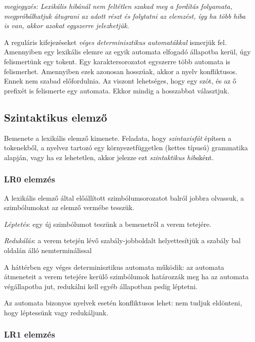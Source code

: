\documentclass[margin=0px]{article}
\begin{document}
	\textit{megjegyzés: Lexikális hibánál nem feltétlen szakad meg a fordítás folyamata, megpróbálhatjuk átugrani az adott részt és folytatni az elemzést, így ha több hiba is van, akkor azokat egyszerre jelezhetjük.}
	
	A reguláris kifejezéseket \textit{véges determinisztikus automatákkal} ismerjük fel. Amennyiben egy lexikális elemre az egyik automata elfogadó állapotba kerül, úgy felismertünk egy tokent. Egy karaktersorozatot egyszerre több automata is felismerhet. Amennyiben ezek azonosan hosszúak, akkor a nyelv konfliktusos. Ennek nem szabad előfordulnia. Az viszont lehetséges, hogy egy szót, és az ő prefixét is felismerte egy automata. Ekkor mindig a hosszabbat választjuk. 
	
\subsection{Szintaktikus elemző}

	Bemenete a lexikális elemző kimenete. Feladata, hogy \textit{szintaxisfát} építsen a tokenekből, a nyelvez tartozó egy környezetfüggetlen (kettes típusú) grammatika alapján, vagy ha ez lehetetlen, akkor jelezze ezt \textit{szintaktikus hiba}ként.
	
\subsubsection{LR0 elemzés}
	
	A lexikális elemző által előállított szimbólumsorozatot balról
	jobbra olvassuk, a szimbólumokat az elemző vermébe tesszük.
	
	\textit{Léptetés}: egy új szimbólumot teszünk a bemenetről a verem
	tetejére.
	
	\textit{Redukálás}: a verem tetején lévő szabály-jobboldalt
	helyettesítjük a szabály bal oldalán álló nemterminálissal
	
	A háttérben egy véges determinisztikus automata működik:
	az automata átmeneteit a verem tetejére kerülő szimbólumok
	határozzák meg
	ha az automata végállapotba jut, redukálni kell
	egyéb állapotban pedig léptetni.
	
	Az automata bizonyos nyelvek esetén konfliktusos lehet: nem tudjuk eldönteni, hogy léptessünk vagy redukáljunk.
	
\subsubsection{LR1 elemzés}
	
\end{document}
